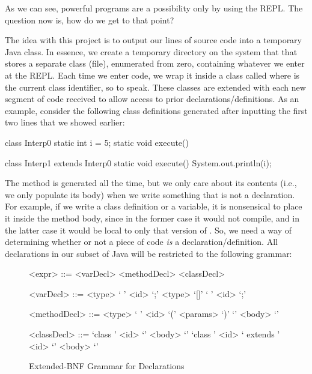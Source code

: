As we can see, powerful programs are a possibility only by using the REPL. 
The question now is, how do we get to that point?

The idea with this project is to output our lines of source code into a temporary Java class. 
In essence, we create a temporary directory on the system that that stores a separate class (file), enumerated from zero, containing whatever we enter at the REPL. 
Each time we enter code, we wrap it inside a class called  where  is the current class identifier, so to speak. 
These classes are extended with each new segment of code received to allow access to prior declarations/definitions. 
As an example, consider the following class definitions generated after inputting the first two lines that we showed earlier:

\begin{verbnobox}[\small]
class Interp0 {
  static int i = 5;
  static void execute() {}
}

class Interp1 extends Interp0 {
  static void execute() {
    System.out.println(i);  
  }
}
\end{verbnobox}

The  method is generated all the time, but we only care about its contents (i.e., we only populate its body) when we write something that is not a declaration. 
For example, if we write a class definition or a variable, it is nonsensical to place it inside the  method body, since in the former case it would not compile, and in the latter case it would be local to only that version of . 
So, we need a way of determining whether or not a piece of code \emph{is} a declaration/definition. 
All declarations in our subset of Java will be restricted to the following grammar:
\\

\setlength{\grammarparsep}{20pt plus 1pt minus 1pt} %
\setlength{\grammarindent}{12em} %
\begin{figure}[H]
  \begin{grammar}
      <expr> ::= <varDecl> 
              \alt <methodDecl> 
              \alt <classDecl>

      <varDecl> ::= <type> ` ' <id> `;'
                \alt <type> `[]' ` ' <id> `;'

      <methodDecl> ::= <type> ` ' <id> `(' <params> `)' `{' <body> `}'

      <classDecl> ::= `class ' <id> `{' <body> `}'
                  \alt `class ' <id> ` extends ' <id> `{' <body> `}'

  \end{grammar}
  \caption{ Extended-BNF Grammar for Declarations }
\end{figure}

